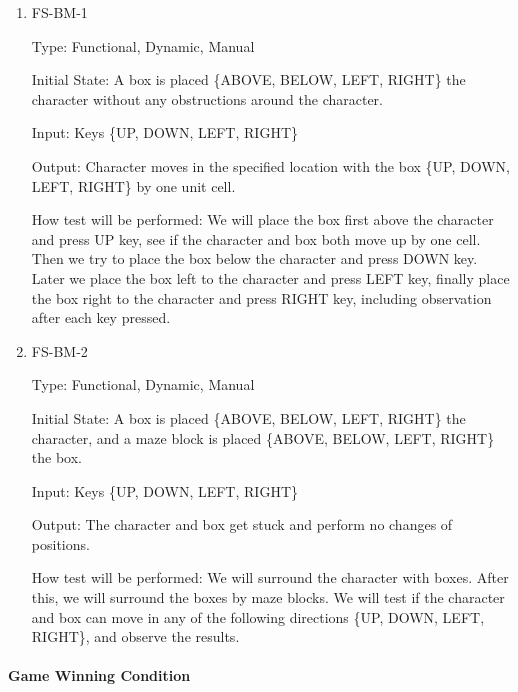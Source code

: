 \documentclass[12pt, titlepage]{article}
\begin{document}
\begin{enumerate}

\item{FS-BM-1\\}

Type: Functional, Dynamic, Manual
					
Initial State: A box is placed \{ABOVE, BELOW, LEFT, RIGHT\} the character without any obstructions around the character.
					
Input: Keys \{UP, DOWN, LEFT, RIGHT\}
					
Output: Character moves in the specified location with the box \{UP, DOWN, LEFT, RIGHT\} by one unit cell.
					
How test will be performed: We will place the box first above the character and press UP key, see if the character and box both move up by one cell. Then we try to place the box below the character and press DOWN key. Later we place the box left to the character and press LEFT key, finally place the box right to the character and press RIGHT key, including observation after each key pressed.

\item{FS-BM-2\\}

Type: Functional, Dynamic, Manual
					
Initial State: A box is placed \{ABOVE, BELOW, LEFT, RIGHT\} the character, and a maze block is placed \{ABOVE, BELOW, LEFT, RIGHT\} the box.
					
Input: Keys \{UP, DOWN, LEFT, RIGHT\}
					
Output: The character and box get stuck and perform no changes of positions. 
					
How test will be performed: We will surround the character with boxes. After this, we will surround the boxes by maze blocks. We will test if the character and box can move in any of the following directions \{UP, DOWN, LEFT, RIGHT\}, and observe the results.

\end{enumerate}

\paragraph{Game Winning Condition}
\end{document}
